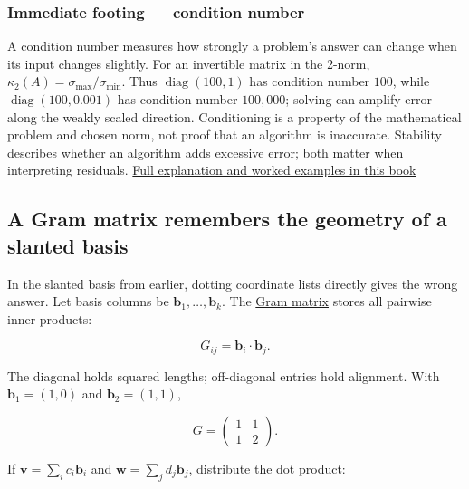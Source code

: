 \subsubsection{Immediate footing --- condition number}\label{01-foundations-i-ch018-immediate-footing-condition-number}

\hypertarget{01-foundations-i-ch018-immediate-footing-condition-number}{}

A condition number measures how strongly a problem's answer can change when its input changes slightly. For an invertible matrix in the 2-norm, \(\kappa_2(A)=\sigma_{\max}/\sigma_{\min}\). Thus \(\operatorname{diag}(100,1)\) has condition number \(100\), while \(\operatorname{diag}(100,0.001)\) has condition number \(100{,}000\); solving can amplify error along the weakly scaled direction. Conditioning is a property of the mathematical problem and chosen norm, not proof that an algorithm is inaccurate. Stability describes whether an algorithm adds excessive error; both matter when interpreting residuals. \hyperref[02-foundations-ii-ch024-conditioning-weak-singular-directions-amplify-uncertainty]{Full explanation and worked examples in this book}

\subsection{A Gram matrix remembers the geometry of a slanted basis}\label{01-foundations-i-ch018-a-gram-matrix-remembers-the-geometry-of-a-slanted-basis}

\hypertarget{01-foundations-i-ch018-a-gram-matrix-remembers-the-geometry-of-a-slanted-basis}{}

In the slanted basis from earlier, dotting coordinate lists directly gives the wrong answer. Let basis columns be \(\mathbf b_1,\ldots,\mathbf b_k\). The \hyperref[01-foundations-i-ch018-a-gram-matrix-remembers-the-geometry-of-a-slanted-basis]{Gram matrix} stores all pairwise inner products:

\[
G_{ij}=\mathbf b_i\cdot\mathbf b_j.
\]

The diagonal holds squared lengths; off-diagonal entries hold alignment. With \(\mathbf b_1=(1,0)\) and \(\mathbf b_2=(1,1)\),

\[
G=\begin{pmatrix}1&1\\1&2\end{pmatrix}.
\]

If \(\mathbf v=\sum_i c_i\mathbf b_i\) and \(\mathbf w=\sum_jd_j\mathbf b_j\), distribute the dot product:

